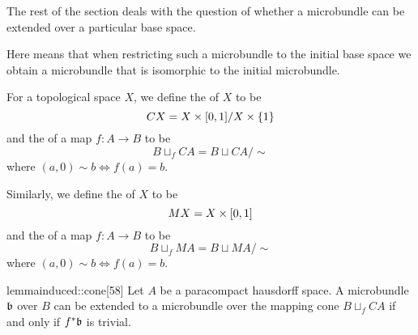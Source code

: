 \begin{myparagraph}
    The rest of the section deals with the question
    of whether a microbundle can be extended
    over a particular base space.

    Here  means that when restricting
    such a microbundle
    to the initial base space we obtain a microbundle that
    is isomorphic to the initial microbundle.
\end{myparagraph}

\begin{myparagraph}
    For a topological space $X$, we define the  of $X$ to be 
    \[ CX = X \times{} [0, 1] / X \times \{1\} \]
    and the  of a map $f: A \to B$ to be
    \[ B \sqcup_f CA = B \sqcup CA / \sim \]
    where $(a, 0) \sim b \iff f(a) = b$.
    
    Similarly, we define the  of $X$ to be
    \[ MX = X \times{} [0, 1] \]
    and the  of a map $f: A \to B$ to be
    \[ B \sqcup_f MA = B \sqcup MA / \sim \]
    where $(a, 0) \sim b \iff f(a) = b$.
\end{myparagraph}

\begin{mystatement}{lemma}{induced::cone}[58]
    Let $A$ be a paracompact hausdorff space.
    A microbundle $\bb$ over $B$ can be extended to a microbundle
    over the mapping cone $B \sqcup_f CA$ if and only if $\ind{f}\bb$ is trivial.
\end{mystatement}

